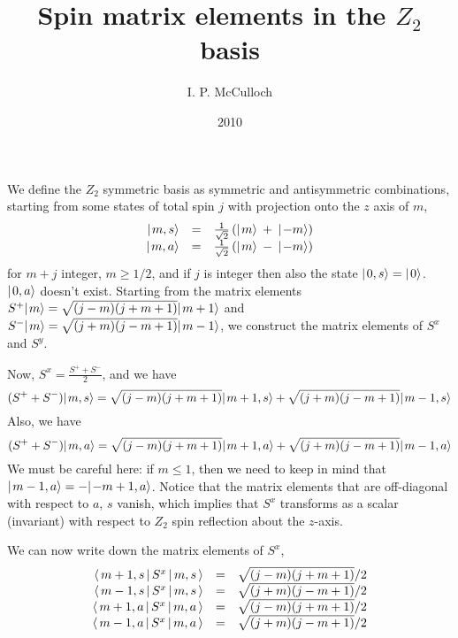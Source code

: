 \documentclass{article}[10pt]
\begin{document}
\title{Spin matrix elements in the $Z_2$ basis}

\author{I. P. McCulloch}
\date{2010}

\maketitle

We define the $Z_2$ symmetric basis as symmetric and antisymmetric
combinations, starting from some states of total spin $j$
with projection onto the $z$ axis of $m$,
\begin{equation}
\begin{array}{rcl}
\hbox{$\mid \! {m,s} \rangle$} &=& \frac{1}{\sqrt{2}}\left( \hbox{$\mid \! {m} \rangle$} \: + \: \hbox{$\mid \! {-m} \rangle$} \right) \\
\hbox{$\mid \! {m,a} \rangle$} &=& \frac{1}{\sqrt{2}}\left( \hbox{$\mid \! {m} \rangle$} \: - \: \hbox{$\mid \! {-m} \rangle$} \right)
\end{array}
\end{equation}
for $m+j$ integer, $m \geq 1/2$, and if $j$ is integer then
also the state $\hbox{$\mid \! {0,s} \rangle$} = \hbox{$\mid \! {0} \rangle$}$.
$\hbox{$\mid \! {0,a} \rangle$}$ doesn't exist.
%
Starting from the matrix elements $S^+\hbox{$\mid \! {m} \rangle$} = \sqrt{(j-m)(j+m+1)}\hbox{$\mid \! {m+1} \rangle$}$
and $S^-\hbox{$\mid \! {m} \rangle$} = \sqrt{(j+m)(j-m+1)}\hbox{$\mid \! {m-1} \rangle$}$, we construct
the matrix elements of $S^x$ and $S^y$.

Now, $S^x = \frac{S^+ + S^-}{2}$, and we have
\[
(S^+ + S^-)\hbox{$\mid \! {m,s} \rangle$} = \sqrt{(j-m)(j+m+1)} \hbox{$\mid \! {m+1,s} \rangle$}
+ \sqrt{(j+m)(j-m+1)} \hbox{$\mid \! {m-1,s} \rangle$}
\]
%
Also, we have
\[
(S^+ + S^-)\hbox{$\mid \! {m,a} \rangle$} = \sqrt{(j-m)(j+m+1)} \hbox{$\mid \! {m+1,a} \rangle$}
+ \sqrt{(j+m)(j-m+1)} \hbox{$\mid \! {m-1,a} \rangle$}
\]
We must be careful here: if $m \leq 1$, then we need
to keep in mind that $\hbox{$\mid \! {m-1,a} \rangle$} = -\hbox{$\mid \! {-m+1,a} \rangle$}$.
%
Notice that the matrix elements that are off-diagonal with 
respect to $a$, $s$ vanish, which implies that
$S^x$ transforms as a scalar (invariant) with respect to
$Z_2$ spin reflection about the $z$-axis.

We can now write down the matrix elements of $S^x$,
\begin{equation}
\begin{array}{rcl}
\langle \, m+1,s \, | \, S^x \, | \, m,s \, \rangle &=& \sqrt{(j-m)(j+m+1)}/2 \\
\langle \, m-1,s \, | \, S^x \, | \, m,s \, \rangle &=& \sqrt{(j+m)(j-m+1)}/2 \\
\langle \, m+1,a \, | \, S^x \, | \, m,a \, \rangle &=& \sqrt{(j-m)(j+m+1)}/2 \\
\langle \, m-1,a \, | \, S^x \, | \, m,a \, \rangle &=& \sqrt{(j+m)(j-m+1)}/2 \\
\end{array}
\end{equation}
\end{document}
